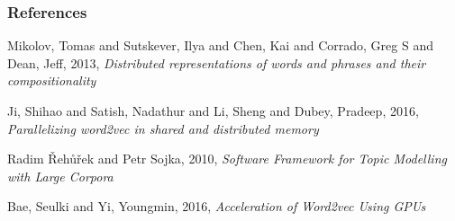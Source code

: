%
%

\begin{frame} \frametitle{References}
\begin{thebibliography}{xx}\footnotesize

 {\sc Mikolov, Tomas and Sutskever, Ilya and Chen, Kai and Corrado, Greg S and Dean, Jeff}, 2013, {\em Distributed representations of words and phrases and their compositionality }

 {\sc Ji, Shihao and Satish, Nadathur and Li, Sheng and Dubey, Pradeep}, 2016, {\em Parallelizing word2vec in shared and distributed memory}


 {\sc Radim {\v R}eh{\r u}{\v r}ek and Petr Sojka}, 2010, {\em Software Framework for Topic Modelling with Large Corpora}

 {\sc Bae, Seulki
and Yi, Youngmin}, 2016, {\em Acceleration of Word2vec Using GPUs}



\end{thebibliography}
\end{frame}